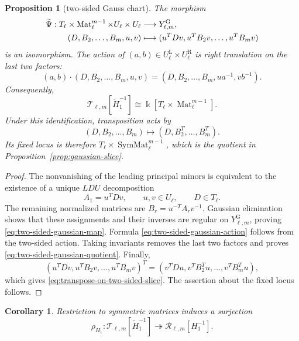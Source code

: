 \documentclass[11pt]{amsart}
\newtheorem{proposition}[theorem]{Proposition}
\newtheorem{corollary}[theorem]{Corollary}
\theoremstyle{definition}
\theoremstyle{remark}
\newcommand{\kk}{\Bbbk}
\newcommand{\SymMat}{\operatorname{SymMat}}
\newcommand{\cR}{\mathcal R}
\newcommand{\cT}{\mathcal T}
\newcommand{\Mat}{\operatorname{Mat}}
\begin{document}
\begin{proposition}[two-sided Gauss chart]
\label{prop:two-sided-gaussian-slice}
The morphism
\begin{align}
 \widetilde\Psi:
 T_\ell\times\Mat_\ell^{m-1}\times U_\ell\times U_\ell
 &\longrightarrow Y_{\ell,m}^{\mathrm G},
 \notag\\
 (D,B_2,\ldots,B_m,u,v)
 &\longmapsto
 (u^TDv,u^TB_2v,\ldots,u^TB_mv)
 \label{eq:two-sided-gaussian-map}
\end{align}
is an isomorphism.  The action of $(a,b)\in
U_\ell^{\mathrm L}\times U_\ell^{\mathrm R}$ is right translation on the
last two factors:
\begin{equation}
 (a,b)\cdot(D,B_2,\ldots,B_m,u,v)
 =(D,B_2,\ldots,B_m,ua^{-1},vb^{-1}).
 \label{eq:two-sided-gaussian-action}
\end{equation}
Consequently,
\begin{equation}
 \cT_{\ell,m}[\widetilde H_1^{-1}]
 \cong\kk[T_\ell\times\Mat_\ell^{m-1}].
 \label{eq:two-sided-gaussian-quotient}
\end{equation}
Under this identification, transposition acts by
\begin{equation}
 (D,B_2,\ldots,B_m)
 \longmapsto(D,B_2^T,\ldots,B_m^T).
 \label{eq:transpose-on-two-sided-slice}
\end{equation}
Its fixed locus is therefore
$T_\ell\times\SymMat_\ell^{m-1}$, which is the quotient in
Proposition~\ref{prop:gaussian-slice}.
\end{proposition}

\begin{proof}
The nonvanishing of the leading principal minors is equivalent to the
existence of a unique $LDU$ decomposition
\[ A_1=u^TDv, \qquad u,v\in U_\ell, \qquad D\in T_\ell. \]
The remaining normalized matrices are $B_r=u^{-T}A_rv^{-1}$.  Gaussian
elimination shows that these assignments and their inverses are regular on
$Y_{\ell,m}^{\mathrm G}$, proving
\eqref{eq:two-sided-gaussian-map}.  Formula
\eqref{eq:two-sided-gaussian-action} follows from the two-sided action.
Taking invariants removes the last two factors and proves
\eqref{eq:two-sided-gaussian-quotient}.  Finally,
\[ (u^TDv,u^TB_2v,\ldots,u^TB_mv)^T =(v^TDu,v^TB_2^Tu,\ldots,v^TB_m^Tu), \]
which gives \eqref{eq:transpose-on-two-sided-slice}.  The assertion about
the fixed locus follows.
\end{proof}

\begin{corollary}
\label{cor:localized-restriction-surjective}
Restriction to symmetric matrices induces a surjection
\[ \rho_{H_1}:\cT_{\ell,m}[\widetilde H_1^{-1}] \twoheadrightarrow\cR_{\ell,m}[H_1^{-1}]. \]
\end{corollary}
\end{document}

